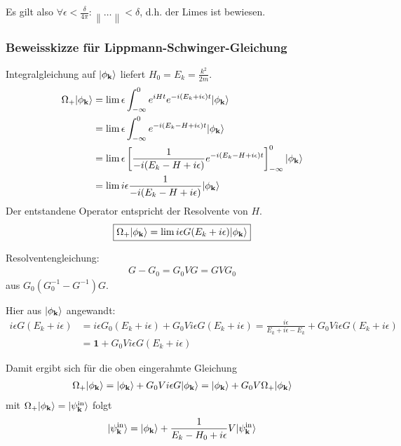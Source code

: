 \documentclass[11pt,a4paper]{report}
\newcommand{\norm}[1]{\left\lVert #1 \right\rVert}
\begin{document}
Es gilt also $\forall \epsilon < \frac{\delta}{4 \pi}: \norm{\ldots} < \delta$, d.h. der Limes ist bewiesen.

\subsubsection{Beweisskizze für Lippmann-Schwinger-Gleichung}

Integralgleichung auf $|\phi_{\mathbf{k}}\rangle$ liefert $H_0 = E_k = \frac{k^2}{2m}$.
\begin{align*}
    \Omega_+ |\phi_{\mathbf{k}}\rangle &= \lim \epsilon \int_{-\infty}^0 e^{i H t} e^{-i (E_k + i \epsilon) t} |\phi_{\mathbf{k}}\rangle \\
    &= \lim \epsilon \int_{-\infty}^0 e^{-i (E_k - H + i \epsilon) t} |\phi_{\mathbf{k}}\rangle \\
    &= \lim \epsilon \left[ \frac{1}{-i (E_k - H + i \epsilon)} e^{-i (E_k - H + i \epsilon) t}\right]_{-\infty}^0 |\phi_{\mathbf{k}}\rangle \\
    &= \lim i \epsilon \frac{1}{-i (E_k - H + i \epsilon)} |\phi_{\mathbf{k}}\rangle
\end{align*}
Der entstandene Operator entspricht der Resolvente von $H$.
\begin{align*}
    \boxed{\Omega_+  |\phi_{\mathbf{k}}\rangle = \lim i \epsilon G(E_k + i \epsilon)  |\phi_{\mathbf{k}}\rangle}
\end{align*}

Resolventengleichung:
\begin{align*}
    G - G_0 = G_0 V G = G V G_0 
\end{align*}
aus $G_0 (G_0^{-1} - G^{-1}) G$.

Hier aus $ |\phi_{\mathbf{k}}\rangle$ angewandt:
\begin{align*}
    i \epsilon G(E_k + i \epsilon) &= i \epsilon G_0 (E_k + i \epsilon) + G_0 V i \epsilon G(E_k + i \epsilon) = \frac{i \epsilon}{E_k + i \epsilon - E_k} + G_0 V i \epsilon G(E_k + i \epsilon) \\
    &= \mathbf{1} + G_0 V i \epsilon G(E_k + i \epsilon)
\end{align*}

Damit ergibt sich für die oben eingerahmte Gleichung
\begin{align*}
    \Omega_+  |\phi_{\mathbf{k}}\rangle =  |\phi_{\mathbf{k}}\rangle + G_0 V i \epsilon G |\phi_{\mathbf{k}}\rangle =  |\phi_{\mathbf{k}}\rangle + G_0 V \Omega_+  |\phi_{\mathbf{k}}\rangle
\end{align*}
mit $\Omega_+  |\phi_{\mathbf{k}}\rangle = |\psi_{\mathbf{k}}^{\text{in}}\rangle$ folgt 
\begin{align*}
    |\psi_{\mathbf{k}}^{\text{in}}\rangle = |\phi_{\mathbf{k}}\rangle + \frac{1}{E_k - H_0 + i \epsilon} V |\psi_{\mathbf{k}}^{\text{in}}\rangle
\end{align*}
\end{document}
